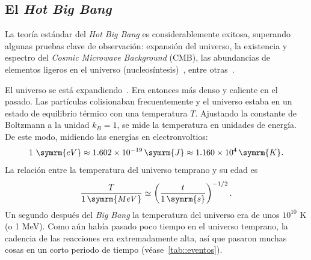 \subsection{El \textit{Hot Big Bang}}
La teoría estándar del \textit{Hot Big Bang} es considerablemente exitosa, superando algunas pruebas clave de observación: expansión del universo, la existencia y espectro del \textit{Cosmic Microwave Background} (CMB), las abundancias de elementos ligeros en el universo (nucleosíntesis)~\cite{gamow1946expanding,alpher1948evolution,alpher1953physical}, entre otras~\cite{liddle1998introduction}.

El universo se está expandiendo~\cite{hubble1929relation}. Era entonces más denso y caliente en el pasado. Las partículas colisionaban frecuentemente y el universo estaba en un estado de equilibrio térmico con una temperatura \(T\). Ajustando la constante de Boltzmann a la unidad \(k_B=1\), se mide la temperatura en unidades de energía. De este modo, midiendo las energías en electronvoltios:
\begin{equation}
    1\ \symrm{eV}\approx 1.602\times 10^{-19}\,\symrm{J}\approx 1.160\times 10^{4}\,\symrm{K}.
\end{equation}
La relación entre la temperatura del universo temprano y su edad es~\cite{baumann2022cosmology}
\begin{equation}
    \frac{T}{1\,\symrm{MeV}}\simeq \left(\frac{t}{1\,\symrm{s}}\right)^{-1/2}.
\end{equation}
Un segundo después del \textit{Big Bang} la temperatura del universo era de unos \(10^{10}\) K (o 1 MeV). Como aún había pasado poco tiempo en el universo temprano, la cadencia de las reacciones era extremadamente alta, así que pasaron muchas cosas en un corto periodo de tiempo (véase~\autoref{tab::eventos}).
